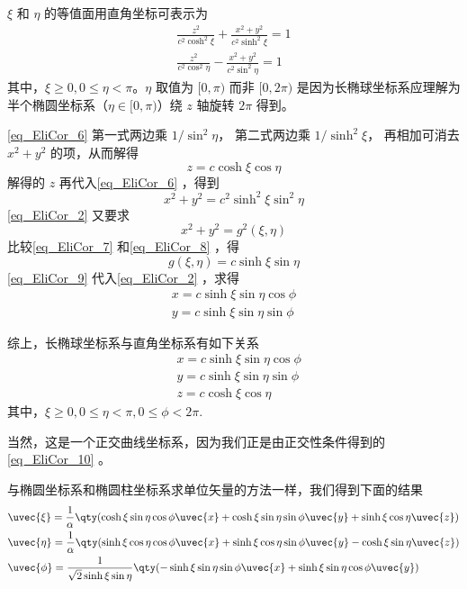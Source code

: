 $\xi$ 和 $\eta$ 的等值面用直角坐标可表示为
\begin{equation}\label{eq_EliCor_6}
\begin{aligned}
\frac{z^2}{c^2\cosh^2\xi}+\frac{x^2+y^2}{c^2\sinh^2\xi}=1\\
\frac{z^2}{c^2\cos^2\eta}-\frac{x^2+y^2}{c^2\sin^2\eta}=1
\end{aligned}
\end{equation}
其中，$\xi\geq 0,0\leq\eta<\pi$。$\eta$ 取值为 $[0,\pi)$ 而非 $[0,2\pi)$ 是因为长椭球坐标系应理解为半个椭圆坐标系（$\eta\in[0,\pi)$）绕 $z$ 轴旋转 $2\pi$ 得到。

\autoref{eq_EliCor_6} 第一式两边乘 $1/\sin^2\eta$， 第二式两边乘 $1/\sinh^2\xi$， 再相加可消去 $x^2+y^2$ 的项，从而解得
\begin{equation}
z=c\cosh\xi\cos\eta
\end{equation}
解得的 $z$ 再代入\autoref{eq_EliCor_6} ，得到
\begin{equation}\label{eq_EliCor_7}
x^2+y^2=c^2\sinh^2\xi\sin^2\eta
\end{equation}
\autoref{eq_EliCor_2} 又要求
\begin{equation}\label{eq_EliCor_8}
x^2+y^2=g^2(\xi,\eta)
\end{equation}
比较\autoref{eq_EliCor_7} 和\autoref{eq_EliCor_8} ，得
\begin{equation}\label{eq_EliCor_9}
g(\xi,\eta)=c\sinh\xi\sin\eta
\end{equation}
\autoref{eq_EliCor_9} 代入\autoref{eq_EliCor_2} ，求得
\begin{equation}
\begin{aligned}
x=c\sinh\xi\sin\eta\cos\phi\\
y=c\sinh\xi\sin\eta\sin\phi
\end{aligned}
\end{equation}

综上，长椭球坐标系与直角坐标系有如下关系
\begin{equation}\label{eq_EliCor_10}
\begin{aligned}
&x=c\sinh\xi\sin\eta\cos\phi\\
&y=c\sinh\xi\sin\eta\sin\phi\\
&z=c\cosh\xi\cos\eta
\end{aligned}
\end{equation}
其中，$\xi\geq 0,0\leq\eta<\pi,0\leq\phi<2\pi$.

当然，这是一个正交曲线坐标系，因为我们正是由正交性条件得到的\autoref{eq_EliCor_10} 。

与椭圆坐标系和椭圆柱坐标系求单位矢量的方法一样，我们得到下面的结果
\begin{equation}
\begin{aligned}
&\uvec{\xi}=\frac{1}{\alpha}\qty(\cosh\xi\sin\eta\cos\phi\uvec{x}+\cosh\xi\sin\eta\sin\phi\uvec{y}+\sinh\xi\cos\eta\uvec{z})\\
&\uvec{\eta}=\frac{1}{\alpha}\qty(\sinh\xi\cos\eta\cos\phi\uvec{x}+\sinh\xi\cos\eta\sin\phi\uvec{y}-\cosh\xi\sin\eta\uvec{z})\\
&\uvec{\phi}=\frac{1}{\sqrt{2}\sinh\xi\sin\eta}\qty(-\sinh\xi\sin\eta\sin\phi\uvec{x}+\sinh\xi\sin\eta\cos\phi\uvec{y})
\end{aligned}
\end{equation}

